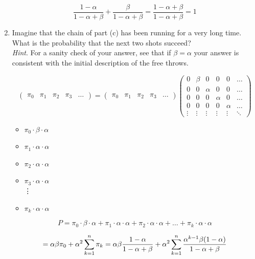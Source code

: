 \documentclass[12pt]{article}
\begin{document}
\begin{enumerate}[label=(\alph*)]
    $$
    \frac{1-\alpha}{1-\alpha +\beta} 
    + \frac{\beta}{1-\alpha+\beta} 
    =\frac{1-\alpha+\beta}{1-\alpha+\beta}
    =1
    $$
    
\newpage
\item Imagine that the chain of part (c) has been running for a very long time. What is the
probability that the next two shots succeed?\\
\textit{Hint}. For a sanity check of your answer, see that if $\beta = \alpha$ your answer is consistent with the initial description of the free throws.

\vspace{1.5\baselineskip}

    $$
    \begin{pmatrix}
        \pi_0&\pi_1&\pi_2&\pi_3&\ldots
    \end{pmatrix}
    =
    \begin{pmatrix}
        \pi_0&\pi_1&\pi_2&\pi_3&\ldots
    \end{pmatrix}
    \begin{pmatrix}
        0&\beta&0&0&0&\ldots\\
        0&0&\alpha&0&0&\ldots\\
        0&0&0&\alpha&0&\ldots\\
        0&0&0&0&\alpha&\ldots\\
        \vdots&\vdots&\vdots&\vdots&\vdots&\ddots
    \end{pmatrix}
    $$
    \begin{itemize}
        \item $\pi_0 \cdot \beta\cdot \alpha$
        \item $\pi_1\cdot \alpha\cdot\alpha$
        \item $\pi_2\cdot \alpha\cdot\alpha$
        \item $\pi_3\cdot \alpha\cdot\alpha$\\
        \vdots
        \item $\pi_k\cdot \alpha\cdot\alpha$
    \end{itemize}
    
    $$
    P = \pi_0 \cdot \beta\cdot \alpha +\pi_1\cdot \alpha\cdot\alpha + \pi_2\cdot \alpha\cdot\alpha + \ldots + \pi_k\cdot \alpha\cdot\alpha
    $$
    
    $$
    = \alpha\beta\pi_0 + \alpha^2\sum_{k=1}^n \pi_k
    = \alpha\beta\frac{1-\alpha}{1-\alpha+\beta}
    + \alpha^2 \sum_{k=1}^n \frac{\alpha^{k-1}\beta(1-\alpha)}{1-\alpha+\beta}\\
    $$
    

\end{enumerate}
\end{document}
